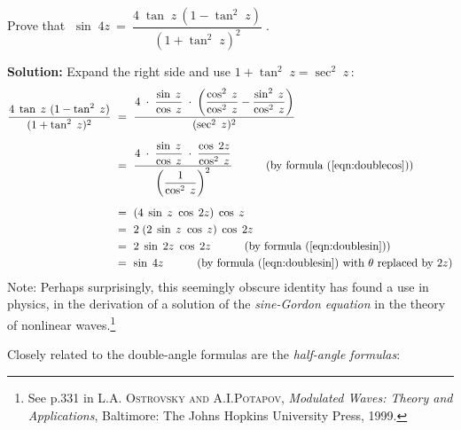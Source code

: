 \begin{exmp}
 Prove that $\;\sin\;4z ~=~ \dfrac{4\;\tan\;z~(1 - \tan^2 \;z)}{(1 + \tan^2 \;z)^2}\;$.\vspace{1mm}
 \par\noindent\textbf{Solution:} Expand the right side and use $1 + \tan^2 \;z= \sec^2 \;z\,$:
 \begin{align*}
  \dfrac{4\;\tan\;z~(1 - \tan^2 \;z)}{(1 + \tan^2 \;z)^2} ~&=~
   \dfrac{4 \;\cdot\; \dfrac{\sin\;z}{\cos\;z} \;\cdot\; \left( \dfrac{\cos^2 \;z}{\cos^2 \;z} -
   \dfrac{\sin^2 \;z}{\cos^2 \;z} \right)}{( \sec^2 \;z )^2}\\[6pt]
  &=~ \dfrac{4 \;\cdot\; \dfrac{\sin\;z}{\cos\;z} \;\cdot\; \dfrac{\cos\;2z}{\cos^2 \;z}}{\left(
   \dfrac{1}{\cos^2 \;z} \right)^2}\quad\qquad\text{(by formula (\ref{eqn:doublecos}))}\\[5pt]
  &=~ (4\;\sin\;z~\cos\;2z)\;\cos\;z\\
  &=~ 2\;(2\;\sin\;z~\cos\;z)\;\cos\;2z\\
  &=~ 2\;\sin\;2z~\cos\;2z\quad\qquad\text{(by formula (\ref{eqn:doublesin}))}\\
  &=~ \sin\;4z\quad\qquad\text{(by formula (\ref{eqn:doublesin}) with $\theta$ replaced by $2z$)}
 \end{align*}
 Note: Perhaps surprisingly, this seemingly obscure identity has found a use in physics,
 in the derivation of a solution of the \emph{sine-Gordon equation} in
 the theory of nonlinear waves.\footnote{See p.331 in \textsc{L.A. Ostrovsky and A.I.Potapov},
 \emph{Modulated Waves: Theory and Applications}, Baltimore: The Johns Hopkins University Press,
 1999.}
\end{exmp}\vspace{-3mm}
\divider
\vspace{1mm}

Closely related to the double-angle formulas are the
\emph{half-angle formulas}:

\begin{center}\end{center}


